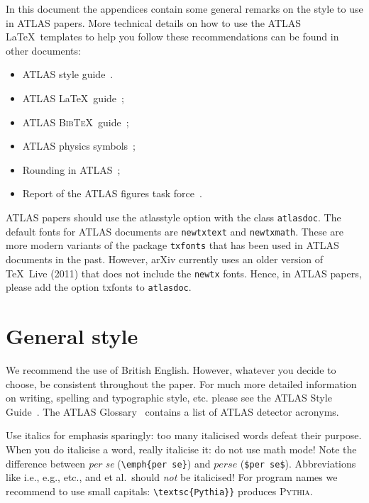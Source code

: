 \documentclass[PAPER,UKenglish]{latex/atlasdoc}
\newcommand{\BibTeX}{\textsc{Bib\TeX}}
\newcommand{\Option}[1]{\textsf{#1}\xspace}
\newcommand{\Package}[1]{\texttt{#1}\xspace}
\begin{document}
In this document the appendices contain some general remarks on the style to use in ATLAS papers.
More technical details on how to use the ATLAS \LaTeX\ templates to help you follow 
these recommendations can be found in other documents:
\begin{itemize}
\item ATLAS style guide~\cite{atlas-style}.
\item ATLAS \LaTeX\ guide~\cite{atlas-latex};
\item ATLAS \BibTeX\ guide~\cite{atlas-bibtex};
\item ATLAS physics symbols~\cite{atlas-physics};
\item Rounding in ATLAS~\cite{atlas-rounding};
\item Report of the ATLAS figures task force~\cite{atlas-figures}.
\end{itemize}

ATLAS papers should use the \Option{atlasstyle} option with the class \Package{atlasdoc}.
The default fonts for ATLAS documents are \Package{newtxtext} and \Package{newtxmath}.
These are more modern variants of the package \Package{txfonts} that has been used in
ATLAS documents in the past.
However, arXiv currently uses an older version of \TeX\ Live (2011) that does not include the
\Package{newtx} fonts. Hence, in ATLAS papers, please add the option \Option{txfonts} to \Package{atlasdoc}.

\section{General style}
\label{sec:english}

We recommend the use of British English. However, whatever you decide
to choose, be consistent throughout the paper. For much more detailed
information on writing, spelling and typographic style, etc. please
see the ATLAS Style Guide~\cite{atlas-style}. 
The ATLAS Glossary~\cite{atlas-glossary} contains a list of ATLAS detector acronyms.

Use italics for emphasis sparingly: too many italicised words defeat
their purpose. When you do italicise a word, really italicise it: do
not use math mode! Note the difference between \emph{per se}
(\verb|\emph{per se}|) and $per se$ (\verb+$per se$+). Abbreviations
like i.e., e.g., etc., and et al.\ should \emph{not} be italicised!
For program names we recommend to use small capitals:
\verb|\textsc{Pythia}}| produces \textsc{Pythia}.
\end{document}
